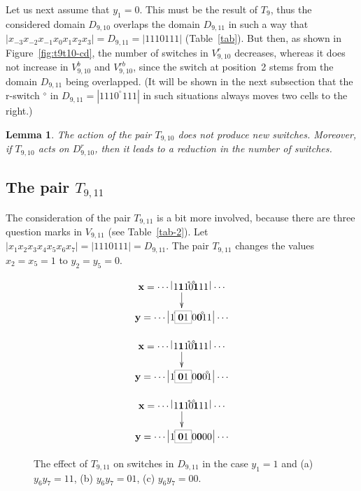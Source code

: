 \documentclass{sn-jnl}
\newtheorem{lem}{Lemma}%
\newcommand{\lllp}{\vline}
\newcommand{\bx}{\mathbf{x}}
\newcommand{\by}{\mathbf{y}}
\newcommand{\gn}[1]{\!^{{}^{{#1}}}\!\!}
\begin{document}
Let us next assume that $y_1=0$. This must be the result of $T_9$, thus the considered domain $D_{9,10}$ overlaps the domain $D_{9,11}$ in such a way that $|x_{-3}x_{-2}x_{-1}x_{0}x_{1}x_{2}x_{3}|=D_{9,11}=|1110111|$ (Table~\ref{tab}).
But then, as shown in Figure~\ref{fig:t9t10-cd}, the number of switches in $V_{9,10}^r$ decreases, whereas it does not increase in $V_{9,10}^b$ and $V_{9,10}^{rb}$, since the switch at position~2 stems from the domain $D_{9,11}$ being overlapped. (It will be shown in the next subsection that the r-switch $^{\diamond}$ in $D_{9,11}=|1110\gn{\diamond}111|$ in such situations always moves two cells to the right.)


\begin{lem}\label{lem:t9t10}
The action of the pair $T_{9,10}$ does not produce new switches. Moreover, if $T_{9,10}$ acts on $D_{9,10}^r$, then it leads to a reduction in the number of switches.
\end{lem}

\subsection{The pair $T_{9,11}$} 

The consideration of the pair $T_{9,11}$ is a bit more involved, because there are three question marks in $V_{9,11}$ (see Table~\ref{tab-2}). Let $|x_1x_{2}x_{3}x_{4}x_{5}x_{6}x_{7}|= |1110111|= D_{9,11}$. The pair $T_{9,11}$ changes the values $x_2=x_5=1$ to $y_2=y_5=0$.

\vspace{-20 pt}
\begin{figure}[h!]
    \centering
    \begin{subfigure}{0.32\textwidth}
{\scriptsize\[
\xymatrix@R=0.5cm{ 
\bx = \cdots \;\lllp  1\boldsymbol{1}1\gn{*}0\gn{\diamond}\boldsymbol{1}11   \,\lllp\,\cdots\ar[d]  \\
\by = \cdots \;\lllp1\gn{*}\fcolorbox{gray}{white}{{\bf{0}}1}0\boldsymbol{0}\gn{\diamond}11  \,\lllp\,\cdots 
}
\]}
    \caption{}
    \label{fig:t9t11(a)}
\end{subfigure} 
\hfill
\begin{subfigure}{0.32\textwidth}
{\scriptsize\[
\xymatrix@R=0.5cm{ 
\bx = \cdots \;\lllp  1\boldsymbol{1}1\gn{*}0\gn{\diamond}\boldsymbol{1}11   \,\lllp\,\cdots\ar[d]  \\
\by = \cdots \;\lllp1\gn{*}\fcolorbox{gray}{white}{{\bf{0}}1}0\boldsymbol{0}0\gn{\diamond}1  \,\lllp\,\cdots 
}
\]}
\caption{}
\label{fig:t9t11(b)} 
\end{subfigure}
\hfill
\begin{subfigure}{0.32\textwidth}
{\scriptsize\[
\xymatrix@R=0.5cm{ 
\bx = \cdots \;\lllp  1\boldsymbol{1}1\gn{*}0\gn{\diamond}\boldsymbol{1}11   \,\lllp\,\cdots\ar[d]  \\
\by = \cdots \;\lllp{1}\gn{*}\fcolorbox{gray}{white}{{\bf{0}}1}0\boldsymbol{0}00  \,\lllp\,\cdots 
}
\]}
\caption{}
\label{fig:t9t11(c)} 
\end{subfigure}
\caption{The effect of $T_{9,11}$ on switches in $D_{9,11}$ in the case $y_1=1$ and
(a) $y_6y_7=11$, (b) $y_6y_7=01$, (c) $y_6y_7=00$.}
\end{figure}
\end{document}
